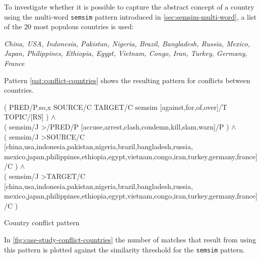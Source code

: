 \documentclass[11pt]{scrreprt}
\newcommand{\citep}{\parencite}  %
\begin{document}
To investigate whether it is possible to capture the abstract concept of a country using the multi-word \texttt{semsim} pattern introduced in \ref{sec:semsim-multi-word}, a list of the 20 most populous countries \citep{wiki:list_of_countries} is used:

\textit{China, USA, Indonesia, Pakistan, Nigeria, Brazil, Bangladesh, Russia, Mexico, Japan, Philippines, Ethiopia, Egypt, Vietnam, Congo, Iran, Turkey, Germany, France}

Pattern \ref{pat:conflict-countries} shows the resulting pattern for conflicts between countries.

\begin{pattern}
  \normalfont\sffamily
  \centering
  ( PRED/P.{so,x} SOURCE/C TARGET/C semsim [against,for,of,over]/T TOPIC/[RS] ) \(\wedge\) \\ 
  ( semsim/J >/PRED/P [accuse,arrest,clash,condemn,kill,slam,warn]/P ) \(\wedge\) \\
  ( semsim/J >SOURCE/C [china,usa,indonesia,pakistan,nigeria,brazil,bangladesh,russia, mexico,japan,philippines,ethiopia,egypt,vietnam,congo,iran,turkey,germany,france]/C ) \(\wedge\) \\
  ( semsim/J >TARGET/C [china,usa,indonesia,pakistan,nigeria,brazil,bangladesh,russia, mexico,japan,philippines,ethiopia,egypt,vietnam,congo,iran,turkey,germany,france]/C )
  \caption{Country conflict pattern}
  \label{pat:conflict-countries}
\end{pattern}


In \ref{fig:case-study-conflict-countries} the number of matches that result from using this pattern is plotted against the similarity threshold for the \texttt{semsim} pattern.
\end{document}
